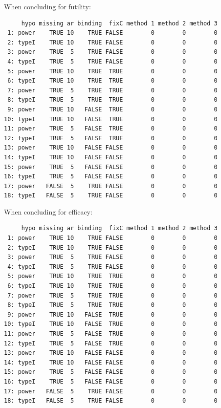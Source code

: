 \documentclass[12pt]{article}
\begin{document}
When concluding for futility:
\begin{verbatim}
     hypo missing ar binding  fixC method 1 method 2 method 3
 1: power    TRUE 10    TRUE FALSE        0        0        0
 2: typeI    TRUE 10    TRUE FALSE        0        0        0
 3: power    TRUE  5    TRUE FALSE        0        0        0
 4: typeI    TRUE  5    TRUE FALSE        0        0        0
 5: power    TRUE 10    TRUE  TRUE        0        0        0
 6: typeI    TRUE 10    TRUE  TRUE        0        0        0
 7: power    TRUE  5    TRUE  TRUE        0        0        0
 8: typeI    TRUE  5    TRUE  TRUE        0        0        0
 9: power    TRUE 10   FALSE  TRUE        0        0        0
10: typeI    TRUE 10   FALSE  TRUE        0        0        0
11: power    TRUE  5   FALSE  TRUE        0        0        0
12: typeI    TRUE  5   FALSE  TRUE        0        0        0
13: power    TRUE 10   FALSE FALSE        0        0        0
14: typeI    TRUE 10   FALSE FALSE        0        0        0
15: power    TRUE  5   FALSE FALSE        0        0        0
16: typeI    TRUE  5   FALSE FALSE        0        0        0
17: power   FALSE  5    TRUE FALSE        0        0        0
18: typeI   FALSE  5    TRUE FALSE        0        0        0
\end{verbatim}

When concluding for efficacy:
\begin{verbatim}
     hypo missing ar binding  fixC method 1 method 2 method 3
 1: power    TRUE 10    TRUE FALSE        0        0        0
 2: typeI    TRUE 10    TRUE FALSE        0        0        0
 3: power    TRUE  5    TRUE FALSE        0        0        0
 4: typeI    TRUE  5    TRUE FALSE        0        0        0
 5: power    TRUE 10    TRUE  TRUE        0        0        0
 6: typeI    TRUE 10    TRUE  TRUE        0        0        0
 7: power    TRUE  5    TRUE  TRUE        0        0        0
 8: typeI    TRUE  5    TRUE  TRUE        0        0        0
 9: power    TRUE 10   FALSE  TRUE        0        0        0
10: typeI    TRUE 10   FALSE  TRUE        0        0        0
11: power    TRUE  5   FALSE  TRUE        0        0        0
12: typeI    TRUE  5   FALSE  TRUE        0        0        0
13: power    TRUE 10   FALSE FALSE        0        0        0
14: typeI    TRUE 10   FALSE FALSE        0        0        0
15: power    TRUE  5   FALSE FALSE        0        0        0
16: typeI    TRUE  5   FALSE FALSE        0        0        0
17: power   FALSE  5    TRUE FALSE        0        0        0
18: typeI   FALSE  5    TRUE FALSE        0        0        0
\end{verbatim}
\end{document}
